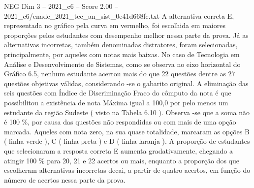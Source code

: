 \begin{textsample}{NEG Dim 3 – 2021\_c6 – Score 2.00 – 2021\_c6/enade\_2021\_tec\_an\_sist\_0e41d668fe.txt}
A alternativa correta E, representada no gráfico pela curva em vermelho, foi escolhida em maiores proporções pelos estudantes com desempenho melhor nessa parte da prova.
Já as alternativas incorretas, também denominadas distratores, foram selecionadas, principalmente, por aqueles com notas mais baixas.
No caso de Tecnologia em Análise e Desenvolvimento de Sistemas, como se observa no eixo horizontal do Gráfico 6.5, nenhum estudante acertou mais do que 22 questões dentre as 27 questões objetivas válidas, considerando -se o gabarito original.
A eliminação das seis questões com Índice de Discriminação Fraco do cômputo da nota é que possibilitou a existência de nota Máxima igual a 100,0 por pelo menos um estudante da região Sudeste ( visto na Tabela 6.10 ).
Observa -se que a soma não é 100 \%, por causa das questões não respondidas ou com mais de uma opção marcada.
Aqueles com nota zero, na sua quase totalidade, marcaram as opções B ( linha verde ), C ( linha preta ) e D ( linha laranja ).
A proporção de estudantes que selecionaram a resposta correta E aumenta gradativamente, chegando a atingir 100 \% para 20, 21 e 22 acertos ou mais, enquanto a proporção dos que escolheram alternativas incorretas decai, a partir de quatro acertos, em função do número de acertos nessa parte da prova.

\end{textsample}
